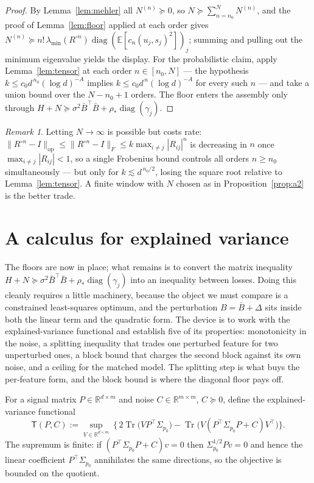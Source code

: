 \documentclass[11pt]{article}
\theoremstyle{remark}
\newtheorem{remark}{Remark}
\newcommand{\E}{\mathbb{E}}
\newcommand{\R}{\mathbb{R}}
\newcommand{\Tr}{\operatorname{Tr}}
\newcommand{\diag}{\operatorname{diag}}
\newcommand{\Sig}{\Sigma_{p_0}}
\newcommand{\lmin}{\lambda_{\min}}
\newcommand{\TT}{\mathsf{T}}
\begin{document}
\begin{proof}
By Lemma~\ref{lem:mehler} all $N^{(n)} \succeq 0$, so $N \succeq \sum_{n=n_0}^N N^{(n)}$, and the proof of Lemma~\ref{lem:floor} applied at each order gives $N^{(n)} \succeq n!\,\lmin(R^{\circ n})\diag(\E[c_n(u_j,s_j)^2])_j$; summing and pulling out the minimum eigenvalue yields the display. For the probabilistic claim, apply Lemma~\ref{lem:tensor} at each order $n \in [n_0, N]$ --- the hypothesis $k \le c_0 d^{\,n_0}(\log d)^{-A}$ implies $k \le c_0 d^{\,n}(\log d)^{-A}$ for every such $n$ --- and take a union bound over the $N - n_0 + 1$ orders. The floor enters the assembly only through $H + N \succeq \sigma^2\bar B^\top\bar B + \rho_*\diag(\gamma_j)$.
\end{proof}

\begin{remark}
Letting $N \to \infty$ is possible but costs rate: $\lVert R^{\circ n} - I\rVert_{\mathrm{op}} \le \lVert R^{\circ n} - I\rVert_F \le k\max_{i\ne j}|R_{ij}|^{n}$ is decreasing in $n$ once $\max_{i \ne j}|R_{ij}| < 1$, so a single Frobenius bound controls all orders $n \ge n_0$ simultaneously --- but only for $k \lesssim d^{\,n_0/2}$, losing the square root relative to Lemma~\ref{lem:tensor}. A finite window with $N$ chosen as in Proposition~\ref{prop:a2} is the better trade.
\end{remark}

\section{A calculus for explained variance}\label{sec:calc}

The floors are now in place; what remains is to convert the matrix inequality $H + N \succeq \sigma^2\bar B^\top\bar B + \rho_*\diag(\gamma_j)$ into an inequality between losses. Doing this cleanly requires a little machinery, because the object we must compare is a constrained least-squares optimum, and the perturbation $B = \bar B + \Delta$ sits inside both the linear term and the quadratic form. The device is to work with the explained-variance functional and establish five of its properties: monotonicity in the noise, a splitting inequality that trades one perturbed feature for two unperturbed ones, a block bound that charges the second block against its own noise, and a ceiling for the matched model. The splitting step is what buys the per-feature form, and the block bound is where the diagonal floor pays off.

For a signal matrix $P \in \R^{d\times m}$ and noise $C \in \R^{m\times m}$, $C \succeq 0$, define the explained-variance functional
\[
\TT(P, C) := \sup_{V \in \R^{d\times m}}\ \Big\{\, 2\Tr\!\big(V P^\top\Sig\big) - \Tr\!\big(V (P^\top\Sig P + C) V^\top\big) \Big\} .
\]
The supremum is finite: if $(P^\top\Sig P + C)v = 0$ then $\Sig^{1/2}Pv = 0$ and hence the linear coefficient $P^\top\Sig$ annihilates the same directions, so the objective is bounded on the quotient.
\end{document}
